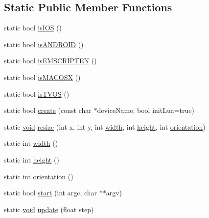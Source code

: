 \subsection*{Static Public Member Functions}
\begin{DoxyCompactItemize}
\item 
static bool \mbox{\hyperlink{classnjli_1_1_n_j_l_i_game_engine_a18bdada0e3ba0fb40de703fe7a958f60}{is\+I\+OS}} ()
\item 
static bool \mbox{\hyperlink{classnjli_1_1_n_j_l_i_game_engine_a2728fbe484c5e56c75525839c144555b}{is\+A\+N\+D\+R\+O\+ID}} ()
\item 
static bool \mbox{\hyperlink{classnjli_1_1_n_j_l_i_game_engine_ac4d956dc87db55cfa0b5bfe0096b976d}{is\+E\+M\+S\+C\+R\+I\+P\+T\+EN}} ()
\item 
static bool \mbox{\hyperlink{classnjli_1_1_n_j_l_i_game_engine_a10a676b87e8a0e467de8e98c595d181c}{is\+M\+A\+C\+O\+SX}} ()
\item 
static bool \mbox{\hyperlink{classnjli_1_1_n_j_l_i_game_engine_a053716ee7a9de6ef968df7756b20a341}{is\+T\+V\+OS}} ()
\item 
static bool \mbox{\hyperlink{classnjli_1_1_n_j_l_i_game_engine_af6225412a3586fdcda3af0cf468a2d4c}{create}} (const char $\ast$device\+Name, bool init\+Lua=true)
\item 
static \mbox{\hyperlink{_thread_8h_af1e856da2e658414cb2456cb6f7ebc66}{void}} \mbox{\hyperlink{classnjli_1_1_n_j_l_i_game_engine_a68f8a09df140f3275e9063fabc52aa4f}{resize}} (int x, int y, int \mbox{\hyperlink{classnjli_1_1_n_j_l_i_game_engine_a3b27833c0d69e5e4a2dec09335b38673}{width}}, int \mbox{\hyperlink{classnjli_1_1_n_j_l_i_game_engine_a56ca64c01ac4d79123229af44a8c2228}{height}}, int \mbox{\hyperlink{classnjli_1_1_n_j_l_i_game_engine_a6fcc45cad0ceac29634f0f76bd922362}{orientation}})
\item 
static int \mbox{\hyperlink{classnjli_1_1_n_j_l_i_game_engine_a3b27833c0d69e5e4a2dec09335b38673}{width}} ()
\item 
static int \mbox{\hyperlink{classnjli_1_1_n_j_l_i_game_engine_a56ca64c01ac4d79123229af44a8c2228}{height}} ()
\item 
static int \mbox{\hyperlink{classnjli_1_1_n_j_l_i_game_engine_a6fcc45cad0ceac29634f0f76bd922362}{orientation}} ()
\item 
static bool \mbox{\hyperlink{classnjli_1_1_n_j_l_i_game_engine_a9b08da977237bdf3b47bc4796c6a62e2}{start}} (int argc, char $\ast$$\ast$argv)
\item 
static \mbox{\hyperlink{_thread_8h_af1e856da2e658414cb2456cb6f7ebc66}{void}} \mbox{\hyperlink{classnjli_1_1_n_j_l_i_game_engine_a0cc3ea87f7451156b3d2b493688bf90a}{update}} (float step)
$$
\end{DoxyCompactItemize}
